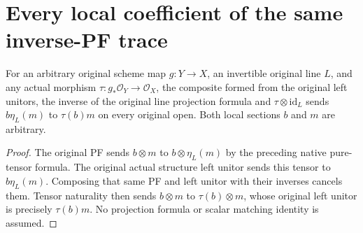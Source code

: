 \section{Every local coefficient of the same inverse-PF trace}

\begin{lemma}
\label{lem:line-pf-unit-trace-native-local-coefficient}
\leanok
For an arbitrary original scheme map $g:Y\to X$, an invertible original
line $L$, and any actual morphism $\tau:g_*\mathcal O_Y\to\mathcal O_X$,
the composite formed from the original left unitors, the inverse of the
original line projection formula and $\tau\otimes\mathrm{id}_L$ sends
$b\eta_L(m)$ to $\tau(b)m$ on every original open. Both local sections
$b$ and $m$ are arbitrary.
\end{lemma}
\begin{proof}
The original PF sends $b\otimes m$ to $b\otimes\eta_L(m)$ by the
preceding native pure-tensor formula. The original actual structure
left unitor sends this tensor to $b\eta_L(m)$. Composing that same PF
and left unitor with their inverses cancels them. Tensor naturality
then sends $b\otimes m$ to $\tau(b)\otimes m$, whose original left
unitor is precisely $\tau(b)m$. No projection formula or scalar
matching identity is assumed.
\end{proof}
